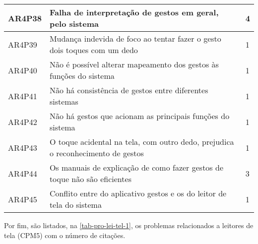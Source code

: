 \begin{table}[htb]
\begin{center}
\begin{tabular}{p{1.2cm}|p{12.0cm}|p{1.2cm}}
      \hline
      AR4P38          & Falha de interpretação de gestos em geral, pelo sistema                            & 4                 \\
      \hline
      AR4P39          & Mudança indevida de foco ao tentar fazer o gesto dois toques com um dedo           & 1                 \\
      \hline
      AR4P40          & Não é possível alterar mapeamento dos gestos às funções do sistema                 & 1                 \\
      \hline
      AR4P41          & Não há consistência de gestos entre diferentes sistemas                            & 1                 \\
      \hline
      AR4P42          & Não há gestos que acionam as principais funções do sistema                         & 1                 \\
      \hline
      AR4P43          & O toque acidental na tela, com outro dedo, prejudica o reconhecimento de gestos    & 1                 \\
      \hline
      AR4P44          & Os manuais de explicação de como fazer gestos de toque não são eficientes          & 3                 \\
      \hline
      AR4P45          & Conflito entre do aplicativo gestos e os do leitor de tela do sistema              & 1                 \\
    \end{tabular}
  \end{center}
\end{table}

\newpage

Por fim, são listados, na \autoref{tab-pro-lei-tel-1}, os problemas relacionados a leitores de tela (CPM5) com o número de citações.

